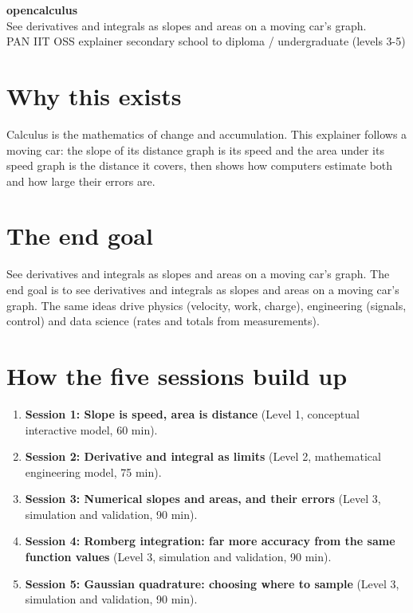 \documentclass[11pt,a4paper]{article}
\begin{document}
\begin{center}{\LARGE\bfseries opencalculus}\\[0.4em]{\large See derivatives and integrals as slopes and areas on a moving car's graph.}\\[0.2em]\small PAN IIT OSS explainer \textbullet{} secondary school to diploma / undergraduate (levels 3-5)\end{center}

\section*{Why this exists}
Calculus is the mathematics of change and accumulation. This explainer follows a moving car: the slope of its distance graph is its speed and the area under its speed graph is the distance it covers, then shows how computers estimate both and how large their errors are.

\section*{The end goal}
See derivatives and integrals as slopes and areas on a moving car's graph. The end goal is to see derivatives and integrals as slopes and areas on a moving car's graph. The same ideas drive physics (velocity, work, charge), engineering (signals, control) and data science (rates and totals from measurements).

\section*{How the five sessions build up}
\begin{enumerate}[nosep]
\item \textbf{Session 1: Slope is speed, area is distance} (Level 1, conceptual interactive model, 60 min).
\item \textbf{Session 2: Derivative and integral as limits} (Level 2, mathematical engineering model, 75 min).
\item \textbf{Session 3: Numerical slopes and areas, and their errors} (Level 3, simulation and validation, 90 min).
\item \textbf{Session 4: Romberg integration: far more accuracy from the same function values} (Level 3, simulation and validation, 90 min).
\item \textbf{Session 5: Gaussian quadrature: choosing where to sample} (Level 3, simulation and validation, 90 min).
\end{enumerate}
\end{document}
